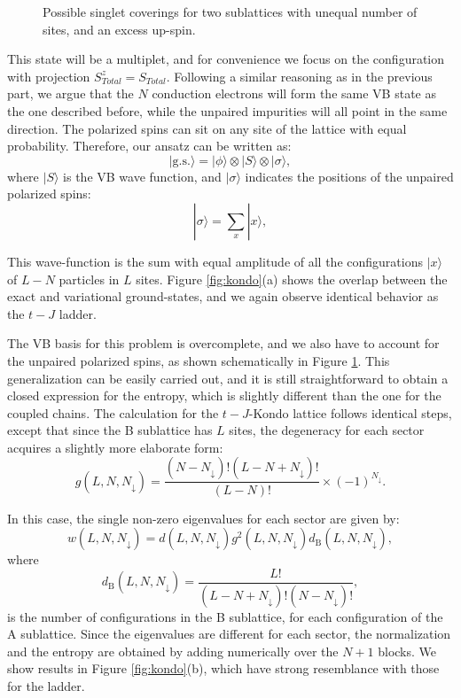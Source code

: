 \documentclass[article,11pt]{revtex4}
\begin{document}
\begin{centering}
\begin{figure} [!h]
\caption{Possible singlet coverings for two sublattices with unequal number of sites, and an excess up-spin.} 
\label{fig:VB2}
\end{figure}
\end{centering}

This state will be a multiplet, and for convenience we focus on the configuration with projection $S^z_{Total}=S_{Total}$. Following a similar reasoning as in the previous part, we argue that the $N$ conduction electrons will form the same VB state as the one described before, while the unpaired impurities will all point in the same direction. The polarized spins can sit on any site of the lattice with equal probability. Therefore, our ansatz can be written as:
\begin{equation}
|\mathrm{g.s.}\rangle=|\phi\rangle \otimes |S\rangle \otimes |\sigma\rangle,
\label{gs4}
\end{equation}
where $|S\rangle$ is the VB wave function, and $|\sigma\rangle$ indicates the positions of the unpaired polarized spins:
\[
|\sigma\rangle = \sum_{x} |x\rangle,
\]

This wave-function is the sum with equal amplitude of all the configurations $|x\rangle$ of $L-N$ particles in $L$ sites.
Figure \ref{fig:kondo}(a) shows the overlap between the exact and variational ground-states, and we again observe identical behavior as the $t-J$ ladder. 

The VB basis for this problem is overcomplete, and we also have to account for the unpaired polarized spins, as shown schematically in Figure \ref{fig:VB2}. This generalization can be easily carried out\cite{Damle2010}, and it is still straightforward to obtain a closed expression for the entropy, which is slightly different than the one for the coupled chains. The calculation for the $t-J$-Kondo lattice follows identical steps, except that since the B sublattice has $L$ sites, the degeneracy for each sector acquires a slightly more elaborate form:
\[
g(L,N,N_\downarrow)=\dfrac{(N-N_{\downarrow})! (L-N+N_{\downarrow})!}{(L-N)!} \times (-1)^{N_{\downarrow}}.
\]

In this case, the single non-zero eigenvalues for each sector are given by:
\[ 
w(L,N,N_\downarrow)=d(L,N,N_\downarrow)g^2(L,N,N_\downarrow)d_\mathrm{B}(L,N,N_\downarrow),
\]
where
\[
d_\mathrm{B}(L,N,N_\downarrow)=\frac{L!}{(L-N+N_\downarrow)!(N-N_\downarrow)!},
\]
is the number of configurations in the B sublattice, for each configuration of the A sublattice. Since the eigenvalues are different for each sector, the normalization and the entropy are obtained by adding numerically over the $N+1$ blocks. We show results in Figure \ref{fig:kondo}(b), which have strong resemblance with those for the ladder. 
\end{document}
